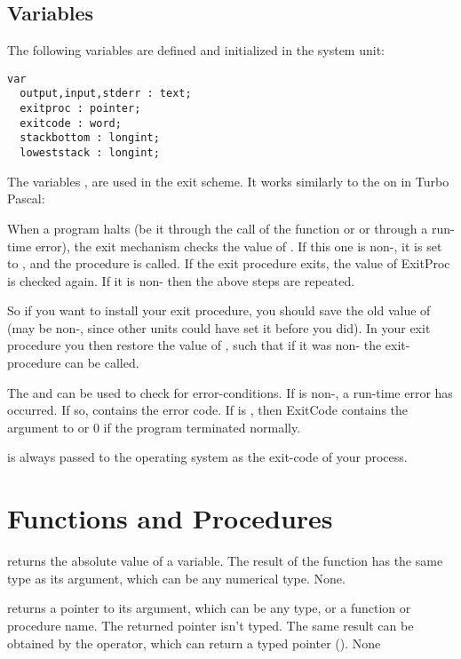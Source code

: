 \documentclass{report}
\begin{document}
\subsection{Variables}
The following variables are defined and initialized in the system unit:
\begin{verbatim}
var
  output,input,stderr : text;
  exitproc : pointer;
  exitcode : word;
  stackbottom : longint;
  loweststack : longint;
\end{verbatim}
The variables ,  are used in the \fpk exit
scheme. It works similarly to the on in Turbo Pascal:

When a program halts (be it through the call of the  function or
 or through a run-time error), the exit mechanism checks the value
of . If this one is non-, it is set to , and
the procedure is called. If the exit procedure exits, the value of ExitProc
is checked again. If it is non- then the above steps are repeated.

So if you want to install your exit procedure, you should save the old value
of  (may be non-, since other units could have set it before 
you did). In your exit procedure you then restore the value of
, such that if it was non- the exit-procedure can be
called.

The  and  can be used to check for
error-conditions. If  is non-, a run-time error has
occurred. If so,  contains the error code. If  is
, then {ExitCode} contains the argument to  or 0 if the
program terminated normally.

 is always passed to the operating system as the exit-code of
your process.

\section{Functions and Procedures}
{ returns the absolute value of a variable. The result of the
function has the same type as its argument, which can be any numerical
type.}
{None.}
{}



{ returns a pointer to its argument, which can be any type, or a
function or procedure name. The returned pointer isn't typed.
The same result can be obtained by the  operator, which can return a
typed pointer (\progref). }
{None}
{}
\end{document}
